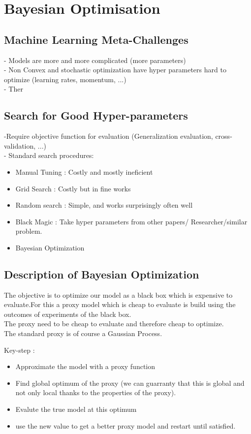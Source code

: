 	\section{Bayesian Optimisation}

		\subsection{Machine Learning Meta-Challenges}

			- Models are more and more complicated (more parameters)\\
			- Non Convex and stochastic optimization have hyper parameters hard to optimize (learning rates, momentum, ...)\\
			- Ther

		\subsection{Search for Good Hyper-parameters}

			-Require objective function for evaluation (Generalization evaluation, cross-validation, ...)\\
			- Standard search procedures:
			\begin{itemize}
				\item Manual Tuning : Costly and mostly ineficient
				\item Grid Search : Costly but in fine works
				\item Random search : Simple, and works surprisingly often well 
				\item Black Magic : Take hyper parameters from other papers/ Researcher/similar problem.
				\item Bayesian Optimization
			\end{itemize}

		\subsection{Description of Bayesian Optimization}

			The objective is to optimize our model as a black box which is expensive to evaluate.For this a proxy model which is cheap to evaluate is build using the outcomes of experiments of the black box.\\
			The proxy need to be cheap to evaluate and therefore cheap to optimize.\\
			The standard proxy is of course a Gaussian Process.

			Key-step :
			\begin{itemize}
				\item Approximate the model  with a proxy function
				\item Find global optimum of the proxy (we can guarranty that this is global and not only local thanks to the properties of the proxy).
				\item Evalute the true model at this optimum
				\item use the new value to get a better proxy model and restart until satisfied.
			\end{itemize}

